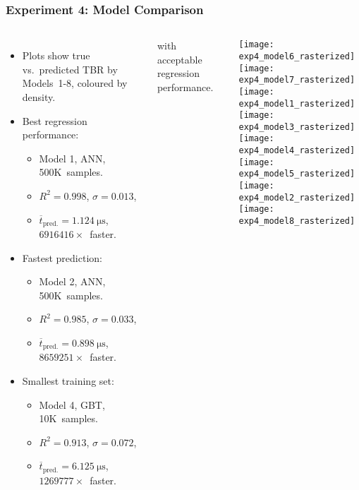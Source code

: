 \begin{frame}
	\frametitle{Experiment 4: Model Comparison}
	\begin{columns}
		\begin{itemize}
			\item
				Plots show true vs.~predicted TBR by Models~1-8,
				coloured by density.
			\item
				Best regression performance:
				\begin{itemize}
					\item
						Model 1, ANN, 500K~samples.
					\item
						$R^2=\num{0.998}$,
						$\sigma=\num{0.013}$,
					\item
						$\overline{t}_{\text{pred.}}=\SI{1.124}{\micro\second}$,
						$\num{6916416} \times$~faster.
				\end{itemize}
			\item
				Fastest prediction:\textsuperscript{\textdagger}
				\begin{itemize}
					\item
						Model 2, ANN, 500K~samples.
					\item
						$R^2=\num{0.985}$,
						$\sigma=\num{0.033}$,
					\item
						$\overline{t}_{\text{pred.}}=\SI{0.898}{\micro\second}$,
						$\num{8659251} \times$~faster.
				\end{itemize}
			\item
				Smallest training set:\textsuperscript{\textdagger}
				\begin{itemize}
					\item
						Model 4, GBT, 10K~samples.
					\item
						$R^2=\num{0.913}$,
						$\sigma=\num{0.072}$,
					\item
						$\overline{t}_{\text{pred.}}=\SI{6.125}{\micro\second}$,
						$\num{1269777} \times$~faster.
				\end{itemize}
		\end{itemize}

		{\footnotesize
			\textsuperscript{\textdagger}
			with acceptable regression performance.
		}

		\texttt{[image: exp4\_model6\_rasterized]}\hfill%
		\texttt{[image: exp4\_model7\_rasterized]}\\\vspace{-4pt}%
		\texttt{[image: exp4\_model1\_rasterized]}\hfill%
		\texttt{[image: exp4\_model3\_rasterized]}\\\vspace{-4pt}%
		\texttt{[image: exp4\_model4\_rasterized]}\hfill%
		\texttt{[image: exp4\_model5\_rasterized]}\\\vspace{-4pt}%
		\texttt{[image: exp4\_model2\_rasterized]}\hfill%
		\texttt{[image: exp4\_model8\_rasterized]}%
	\end{columns}
\end{frame}
